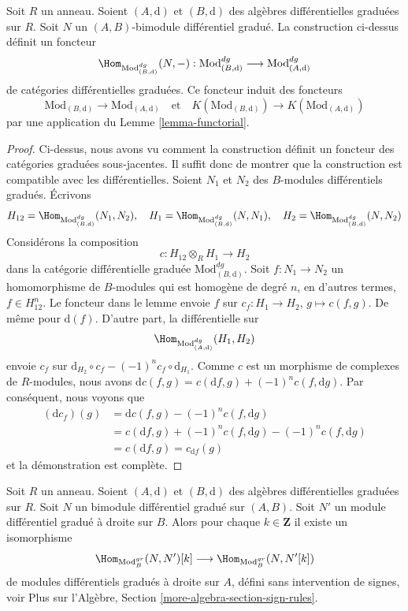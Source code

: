 \begin{lemma}
\label{lemma-hom}
Soit $R$ un anneau. Soient $(A, \text{d})$ et $(B, \text{d})$ des algèbres
différentielles graduées sur $R$. Soit $N$ un $(A,
B)$-bimodule différentiel gradué. La construction ci-dessus définit un foncteur
$$
\Hom_{\text{Mod}^{dg}_{(B, \text{d})}}(N, -) :
\text{Mod}^{dg}_{(B, \text{d})}
\longrightarrow
\text{Mod}^{dg}_{(A, \text{d})}
$$
de catégories différentielles graduées. Ce foncteur induit des foncteurs
$$
\text{Mod}_{(B, \text{d})} \to \text{Mod}_{(A, \text{d})}
\quad\text{et}\quad
K(\text{Mod}_{(B, \text{d})}) \to K(\text{Mod}_{(A, \text{d})})
$$
par une application du Lemme \ref{lemma-functorial}.
\end{lemma}

\begin{proof}
Ci-dessus, nous avons vu comment la construction définit un foncteur des
catégories graduées sous-jacentes. Il suffit donc de montrer que la construction
est compatible avec les différentielles. Soient $N_1$ et $N_2$ des $B$-modules
différentiels gradués. Écrivons
$$
H_{12} = \Hom_{\text{Mod}^{dg}_{(B, \text{d})}}(N_1, N_2),\quad
H_1 = \Hom_{\text{Mod}^{dg}_{(B, \text{d})}}(N, N_1),\quad
H_2 = \Hom_{\text{Mod}^{dg}_{(B, \text{d})}}(N, N_2)
$$
Considérons la composition
$$
c : H_{12} \otimes_R H_1 \longrightarrow H_2
$$
dans la catégorie différentielle graduée $\text{Mod}^{dg}_{(B, \text{d})}$. Soit
$f : N_1 \to N_2$ un homomorphisme de $B$-modules qui est homogène de degré $n$, en
d'autres termes, $f \in H_{12}^n$. Le foncteur dans le lemme envoie $f$ sur $c_f :
H_1 \to H_2$, $g \mapsto c(f, g)$. De même pour $\text{d}(f)$. D'autre part, la
différentielle sur
$$
\Hom_{\text{Mod}^{dg}_{(A, \text{d})}}(H_1, H_2)
$$
envoie $c_f$ sur $\text{d}_{H_2} \circ c_f - (-1)^n c_f \circ \text{d}_{H_1}$. Comme
$c$ est un morphisme de complexes de $R$-modules, nous avons $\text{d} c(f, g) =
c(\text{d}f, g) + (-1)^n c(f, \text{d}g)$. Par conséquent, nous voyons que
\begin{align*}
(\text{d}c_f)(g)
& =
\text{d}c(f,g) - (-1)^n c(f, \text{d}g) \\
& =
c(\text{d}f, g) + (-1)^n c(f, \text{d}g)  - (-1)^n c(f, \text{d}g) \\
& =
c(\text{d}f, g) = c_{\text{d}f}(g)
\end{align*}
et la démonstration est complète.
\end{proof}

\begin{remark}
\label{remark-shift-hom-no-sign}
Soit $R$ un anneau. Soient $(A, \text{d})$ et $(B, \text{d})$ des algèbres
différentielles graduées sur $R$. Soit $N$ un bimodule différentiel gradué sur
$(A, B)$. Soit $N'$ un module différentiel gradué à droite sur $B$. Alors pour
chaque $k \in \mathbf{Z}$ il existe un isomorphisme
$$
\Hom_{\text{Mod}^{gr}_B}(N, N')[k]
\longrightarrow
\Hom_{\text{Mod}^{gr}_B}(N, N'[k])
$$
de modules différentiels gradués à droite sur $A$, défini sans intervention de
signes, voir Plus sur l'Algèbre, Section \ref{more-algebra-section-sign-rules}.
\end{remark}

